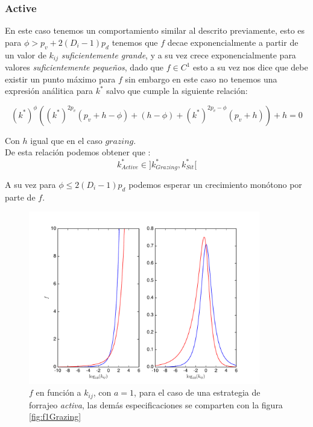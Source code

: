 \subsubsection{Active}

En este caso tenemos un comportamiento similar al descrito previamente, esto es para $\phi > p_v + 2(D_i -1) p_d$ tenemos que $f$ decae exponencialmente a partir de un valor de $k_{ij}$ \emph{suficientemente grande}, y a su vez crece exponencialmente para valores \emph{suficientemente peque\~nos}, dado que $f \in C^1$ esto a su vez nos dice que debe existir un punto m\'aximo para $f$ sin embargo en este caso no tenemos una expresi\'on an\'alitica para $k^*$ salvo que cumple la siguiente relaci\'on:

\begin{equation}
  (k^*)^{\phi}((k^*)^{2p_v}(p_v+ h -\phi) + (h -\phi) + (k^*)^{2p_v - \phi}(p_v + h ) ) + h = 0
\end{equation}

Con $h$ igual que en el caso $grazing$.\\
De esta relaci\'on podemos obtener que :
\begin{equation}
  k^*_{Active} \in ] k^*_{Grazing} , k^*_{Sit} [
\end{equation}

A su vez para $\phi \leq 2(D_i - 1)p_d $ podemos esperar un crecimiento mon\'otono por parte de $f$. 

\begin{figure}
\begin{center}
 \includegraphics[width=0.9\textwidth]{./Plots/f1Active.pdf}
 \caption[$f_1, Active$]{$f$ en funci\'on a $k_{ij}$, con $a =1$, para el caso de una estrategia de forrajeo \emph{activa}, las dem\'as especificaciones se comparten con la figura \ref{fig:f1Grazing}}
 \label{fig:f1Active} 
\end{center}
\end{figure}


